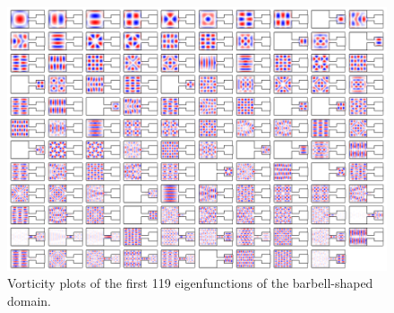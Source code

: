 \begin{figure}
  \centering
  \includegraphics[width=\textwidth]{fig/barbell_gallery}
  \caption{Vorticity plots of the first 119 eigenfunctions
    of the barbell-shaped domain.}
  \label{fig:barbell_gallery}
\end{figure}

